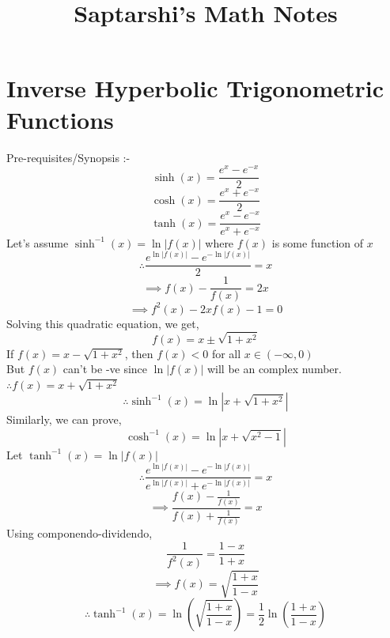 \documentclass[14pt]{article}
\begin{document}
	\title{Saptarshi's Math Notes}
	\maketitle
	\section{Inverse Hyperbolic Trigonometric Functions}
	\large{Pre-requisites/Synopsis :-}
	\begin{equation}
		\sinh(x)=\frac{e^x-e^{-x}}{2}
	\end{equation}
	\begin{equation}
		\cosh(x)=\frac{e^x+e^{-x}}{2}
	\end{equation}
	\begin{equation}
		\tanh(x)=\frac{e^x-e^{-x}}{e^x+e^{-x}}
	\end{equation}
	Let's assume $\sinh^{-1}(x)=\ln|f(x)|$ where $f(x)$ is some function of $x$ 
	\\ \begin{equation*}
	\therefore \frac{e^{\ln|f(x)|}-e^{-\ln|f(x)|}}{2} = x	
	\end{equation*}
	\begin{equation*}					%
	\implies f(x)-\frac{1}{f(x)} = 2x		
	\end{equation*}
	\begin{equation*}
	\implies f^2(x)-2xf(x)-1 = 0		
	\end{equation*}
	Solving this quadratic equation, we get,
	\begin{equation*}
		f(x)=x\pm\sqrt{1+x^2}
	\end{equation*}
	If $f(x)=x-\sqrt{1+x^2}$, then $f(x)<0$ for all $x\in(-\infty,0)$
	\\ But $f(x)$ can't be -ve since $\ln|f(x)|$ will be an complex number.
	$\therefore f(x)=x+\sqrt{1+x^2}$
	\begin{equation}
		\therefore \boxed{\sinh^{-1}(x)=\ln|x+\sqrt{1+x^2}|}
	\end{equation}
	Similarly, we can prove,
	\begin{equation}
	\boxed{\cosh^{-1}(x)=\ln|x+\sqrt{x^2-1}|}
	\end{equation}
	Let $\tanh^{-1}(x)=\ln|f(x)|$
	\begin{equation*}
		\therefore \frac{e^{\ln|f(x)|}-e^{-\ln|f(x)|}}{e^{\ln|f(x)|}+e^{-\ln|f(x)|}}=x
	\end{equation*}
	\begin{equation*}
	\implies \frac{f(x)-\frac{1}{f(x)}}{f(x)+\frac{1}{f(x)}}=x
	\end{equation*}
	Using componendo-dividendo,
	\begin{equation*}
	\frac{1}{f^2(x)}=\frac{1-x}{1+x}
	\end{equation*}
	\begin{equation*}
	\implies f(x)=\sqrt{\frac{1+x}{1-x}}
	\end{equation*}
	\begin{equation}
	\therefore \boxed{\tanh^{-1}(x)=\ln(\sqrt{\frac{1+x}{1-x}})=\frac{1}{2}\ln(\frac{1+x}{1-x})}
	\end{equation}
\end{document}
